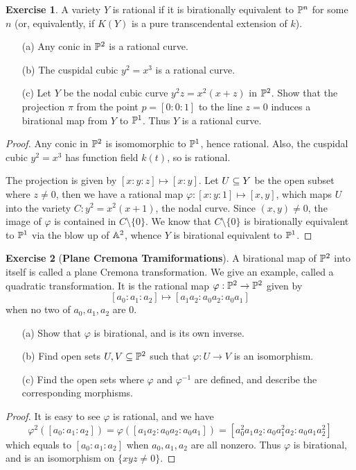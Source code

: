 \documentclass[11pt]{book}
\theoremstyle{definition}
\newtheorem{exercise}{Exercise}[section]
\begin{document}
\begin{exercise}
A variety $Y$ is rational if it is birationally equivalent to $\P^n$ for some $n$ (or, equivalently, if $K(Y)$ is a pure transcendental extension of $k$).
\begin{itemize}
\item[(a)] Any conic in $\P^2$ is a rational curve.
\item[(b)] The cuspidal cubic $y^2=x^3$ is a rational curve.
\item[(c)] Let $Y$ be the nodal cubic curve $y^2z=x^2(x+z)$ in $\P^2$. Show that the projection $\pi$ from the point $p=[0:0:1]$ to the line $z=0$ induces a birational map from $Y$ to $\P^1$. Thus $Y$ is a rational curve. 
\end{itemize}
\end{exercise}
\begin{proof}
Any conic in $\P^2$ is isomomorphic to $\P^1$, hence rational. Also, the cuspidal cubic $y^2=x^3$ has function field $k(t)$, so is rational.\par
The projection is given by $[x:y:z]\mapsto[x:y]$. Let $U\sub Y$ be the open subset where $z\neq 0$, then we have a rational map $\varphi:[x:y:1]\mapsto[x,y]$, which maps $U$ into the variety $C:y^2=x^2(x+1)$, the nodal curve. Since $(x,y)\neq 0$, the image of $\varphi$ is contained in $C\setminus\{0\}$. We know that $C\setminus\{0\}$ is birationally equivalent to $\P^1$ via the blow up of $\A^2$, whence $Y$ is birational equivalent to $\P^1$. 
\end{proof}
\begin{exercise}[\textbf{Plane Cremona Tramiformations}]
A birational map of $\P^2$ into itself is called a plane Cremona transformation. We give an example, called a quadratic transformation. It is the rational map $\varphi:\P^2\to\P^2$ given by
\[[a_0:a_1:a_2]\mapsto[a_1a_2:a_0a_2:a_0a_1]\]
when no two of $a_0,a_1,a_2$ are $0$.
\begin{itemize}
\item[(a)] Show that $\varphi$ is birational, and is its own inverse.
\item[(b)] Find open sets $U,V\sub\P^2$ such that $\varphi:U\to V$ is an isomorphism.
\item[(c)] Find the open sets where $\varphi$ and $\varphi^{-1}$ are defined, and describe the corresponding morphisms.
\end{itemize}
\end{exercise}
\begin{proof}
It is easy to see $\varphi$ is rational, and we have
\[\varphi^2([a_0:a_1:a_2])=\varphi([a_1a_2:a_0a_2:a_0a_1])=[a_0^2a_1a_2:a_0a_1^2a_2:a_0a_1a_2^2]\]
which equals to $[a_0:a_1:a_2]$ when $a_0,a_1,a_2$ are all nonzero. Thus $\varphi$ is birational, and is an isomorphism on $\{xyz\neq 0\}$. 
\end{proof}
\end{document}
